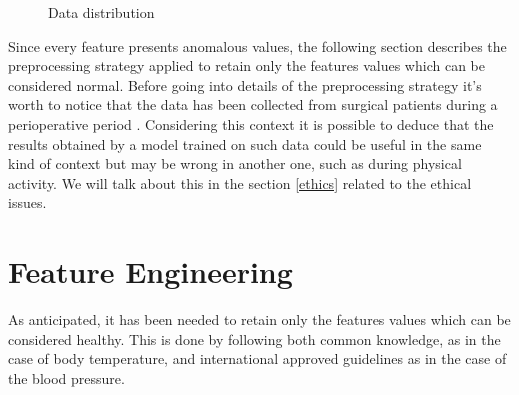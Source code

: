 \documentclass{article}
\begin{document}
\begin{multicols*}{2}
\begin{figure}[H]
			\caption{Data distribution}
		\end{figure}
Since every feature presents anomalous values, the following section describes the preprocessing strategy applied to retain only the features values which can be considered normal.
Before going into details of the preprocessing strategy it's worth to notice that the data has been collected from surgical patients during a perioperative period \cite{VitalDB}. Considering this context it is possible to deduce that the results obtained by a model trained on such data could be useful in the same kind of context but may be wrong in another one, such as during physical activity. We will talk about this in the section \ref{ethics} related to the ethical issues.
\section{Feature Engineering}
		\label{preprocessing}
As anticipated, it has been needed to retain only the features values which can be considered healthy. This is done by following both common knowledge, as in the case of body temperature, and international approved guidelines \cite{ESC} as in the case of the blood pressure.


\end{multicols*}
\end{document}
